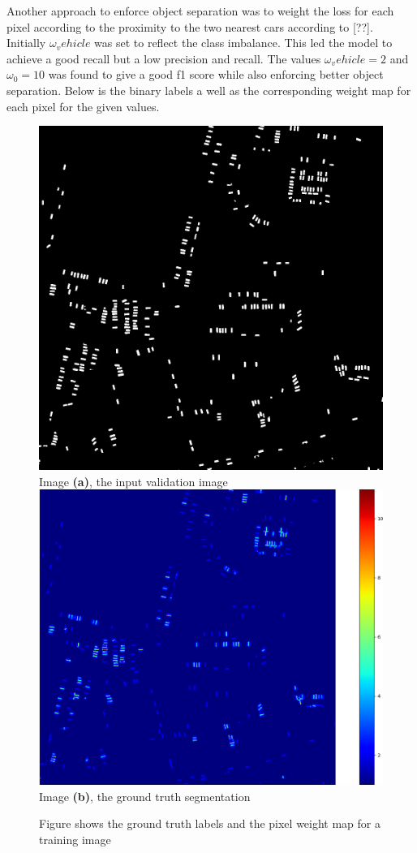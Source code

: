 \documentclass[a4paper,11pt]{article}
\begin{document}
Another approach to enforce object separation was to weight the loss for each pixel according to the proximity to the two nearest cars according to [??]. Initially $\omega_vehicle$ was set to reflect the class imbalance. This led the model to achieve a good recall but a low precision and recall. The values $\omega_vehicle =2$ and $\omega_0=10$ was found to give a good f1 score while also enforcing better object separation. Below is the binary labels a well as the corresponding weight map for each pixel for the given values.
\begin{figure}[H]
  \includegraphics[width=\linewidth]{weight_labels}
  Image \textbf{(a)}, the input validation image
\endminipage\hfill
{}
  \includegraphics[width=\linewidth]{weight_map_3}
  Image \textbf{(b)}, the ground truth segmentation
\endminipage\hfill
\caption{Figure shows the ground truth labels and the pixel weight map for a training image}
\end{figure}
\end{document}
